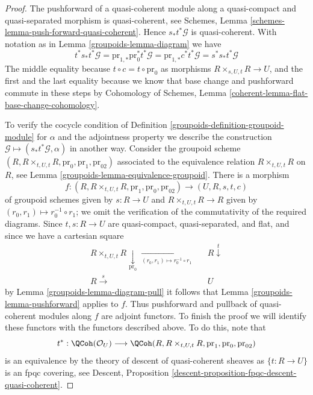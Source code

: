 \begin{proof}

The pushforward of a quasi-coherent module along a quasi-compact and
quasi-separated morphism is quasi-coherent, see Schemes, Lemma
\ref{schemes-lemma-push-forward-quasi-coherent}. Hence $s_*t^*\mathcal{G}$
is quasi-coherent. With notation as in Lemma \ref{groupoids-lemma-diagram} we have
$$
t^*s_*t^*\mathcal{G} =
\text{pr}_{1, *}\text{pr}_0^*t^*\mathcal{G} =
\text{pr}_{1, *}c^*t^*\mathcal{G} =
s^*s_*t^*\mathcal{G}
$$
The middle equality because $t \circ c = t \circ \text{pr}_0$ as
morphisms $R \times_{s, U, t} R \to U$, and the first and the last
equality because we know that base change and pushforward commute in
these steps by Cohomology of Schemes, Lemma
\ref{coherent-lemma-flat-base-change-cohomology}.

\medskip\noindent
To verify the cocycle condition of Definition \ref{groupoids-definition-groupoid-module}
for $\alpha$ and the adjointness property we describe the construction
$\mathcal{G} \mapsto (s_*t^*\mathcal{G}, \alpha)$ in another way.
Consider the groupoid scheme
$(R, R \times_{t, U, t} R, \text{pr}_0, \text{pr}_1, \text{pr}_{02})$
associated to the equivalence relation $R \times_{t, U, t} R$
on $R$, see Lemma \ref{groupoids-lemma-equivalence-groupoid}.
There is a morphism
$$
f :
(R, R \times_{t, U, t} R, \text{pr}_1, \text{pr}_0, \text{pr}_{02})
\longrightarrow
(U, R, s, t, c)
$$
of groupoid schemes given by $s : R \to U$ and $R \times_{t, U, t} R \to R$
given by $(r_0, r_1) \mapsto r_0^{-1} \circ r_1$; we omit the verification
of the commutativity of the required diagrams. Since
$t, s : R \to U$ are quasi-compact, quasi-separated, and flat,
and since we have a cartesian square
$$
\begin{array}{ccc}R \times_{t, U, t} R \underset{\text{pr}_0}{\downarrow}\underset{(r_0, r_1) \mapsto r_0^{-1} \circ r_1}{\longrightarrow} &  & R \overset{t}{\downarrow} \\ R \overset{s}{\longrightarrow} &  & U\end{array}
$$
by Lemma \ref{groupoids-lemma-diagram-pull} it follows that
Lemma \ref{groupoids-lemma-pushforward} applies to $f$.
Thus pushforward and pullback of quasi-coherent modules along
$f$ are adjoint functors. To finish the proof we will identify these functors
with the functors described above. To do this, note that
$$
t^* :
\QCoh(\mathcal{O}_U)
\longrightarrow
\QCoh(R, R \times_{t, U, t} R, \text{pr}_1, \text{pr}_0, \text{pr}_{02})
$$
is an equivalence by the theory of descent of quasi-coherent sheaves as
$\{t : R \to U\}$ is an fpqc covering, see
Descent, Proposition \ref{descent-proposition-fpqc-descent-quasi-coherent}.


\end{proof}
